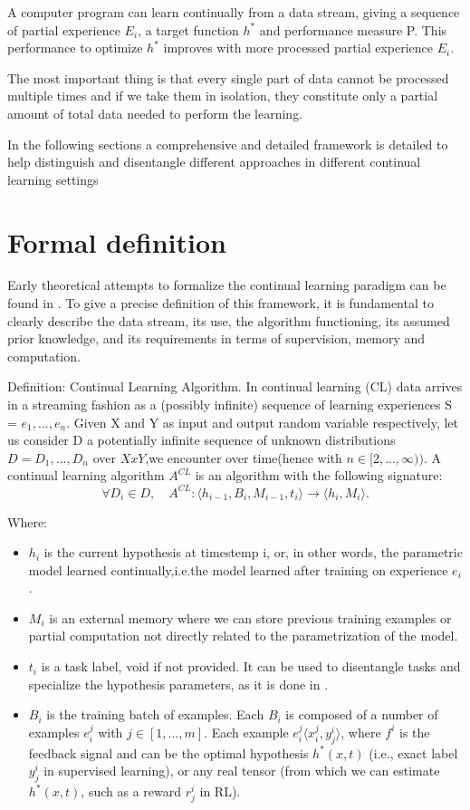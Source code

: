 \documentclass[english, LaM, oneside]{sapthesis}%
\begin{document}
A computer program can learn continually from a data stream, giving a sequence of partial experience $E_i$, a target function $h^\ast$ and performance measure P. This performance to optimize $h^\ast$ improves with more processed partial experience $E_i$.

The most important thing is that every single part of data cannot be processed multiple times and if we take them in isolation, they constitute only a partial amount of total data needed to perform the learning.

In the following sections a comprehensive and detailed framework is detailed to help distinguish and disentangle different approaches in different continual learning settings 
\section{Formal definition}
Early theoretical attempts to formalize the continual learning paradigm can be found in \cite{ring-2005}. 
To give a precise definition of this framework, it is fundamental to clearly describe the data stream, its use, the algorithm functioning, its assumed prior knowledge, and its requirements in terms of supervision, memory and computation.

Definition: Continual Learning Algorithm. In continual learning (CL) data arrives in a streaming fashion as a (possibly infinite) sequence of learning experiences S = $e_1, ..., e_n$. Given X and Y as input and output random variable respectively, let us consider D a potentially infinite sequence of unknown distributions $D={D_1,...,D_n}$ over $X x Y$,we encounter over time(hence with $ n∈[2,...,\infty))$. A continual learning algorithm $A^{CL}$ is an algorithm with the following signature:
\begin{equation}
                \forall D_i\in D, \quad    A^{CL} : \langle h_{i-1}, B_i, M_{i-1}, t_i \rangle \rightarrow  \langle h_i, M_i \rangle. 
\end{equation}

Where:
\begin{itemize}
    \item $h_i$ is the current hypothesis at timestemp i, or, in other words, the parametric model learned continually,i.e.the model learned after training on experience $e_i$.
    \item $M_i$ is an external memory where we can store previous training examples or partial computation not directly related to the parametrization of the model.
    \item $t_i$ is a task label, void if not provided. It can be used to disentangle tasks and specialize the hypothesis parameters, as it is done in \cite{lopez}.
    \item $B_i$ is the training batch of examples. Each $B_i$ is composed of a number of examples $e_i^j$ with $j \in [1,...,m]$. Each example $e_i^j \langle x_i^j, y_j^i \rangle$, where $f^i$ is the feedback signal and can be the optimal hypothesis $h^\ast(x,t)$ (i.e., exact label $y_j^i$ in supervised learning), or any real tensor (from which we can estimate $h^\ast(x,t)$, such as a reward $r_j^i$ in RL).
\end{itemize}
\end{document}
